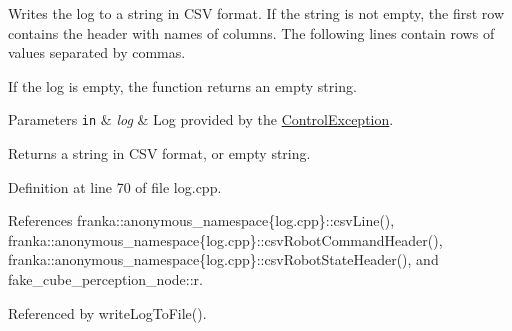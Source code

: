 Writes the log to a string in C\+SV format. If the string is not empty, the first row contains the header with names of columns. The following lines contain rows of values separated by commas.

If the log is empty, the function returns an empty string.


\begin{DoxyParams}[1]{Parameters}
\mbox{\tt in}  & {\em log} & Log provided by the \hyperlink{structfranka_1_1ControlException}{Control\+Exception}.\\
\hline
\end{DoxyParams}
\begin{DoxyReturn}{Returns}
a string in C\+SV format, or empty string. 
\end{DoxyReturn}


Definition at line 70 of file log.\+cpp.



References franka\+::anonymous\+\_\+namespace\{log.\+cpp\}\+::csv\+Line(), franka\+::anonymous\+\_\+namespace\{log.\+cpp\}\+::csv\+Robot\+Command\+Header(), franka\+::anonymous\+\_\+namespace\{log.\+cpp\}\+::csv\+Robot\+State\+Header(), and fake\+\_\+cube\+\_\+perception\+\_\+node\+::r.



Referenced by write\+Log\+To\+File().


